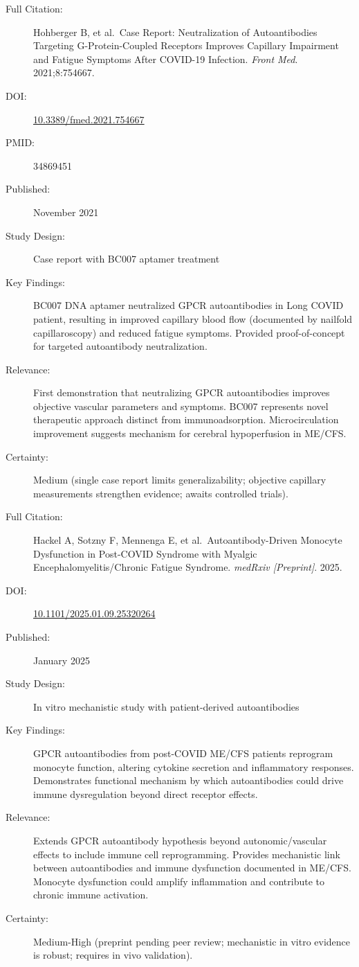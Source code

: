 \begin{description}
    \item[Full Citation:] Hohberger B, et al.\ Case Report: Neutralization of Autoantibodies Targeting G-Protein-Coupled Receptors Improves Capillary Impairment and Fatigue Symptoms After COVID-19 Infection. \textit{Front Med}. 2021;8:754667.
    \item[DOI:] \href{https://doi.org/10.3389/fmed.2021.754667}{10.3389/fmed.2021.754667}
    \item[PMID:] 34869451
    \item[Published:] November 2021
    \item[Study Design:] Case report with BC007 aptamer treatment
    \item[Key Findings:] BC007 DNA aptamer neutralized GPCR autoantibodies in Long COVID patient, resulting in improved capillary blood flow (documented by nailfold capillaroscopy) and reduced fatigue symptoms. Provided proof-of-concept for targeted autoantibody neutralization.
    \item[Relevance:] First demonstration that neutralizing GPCR autoantibodies improves objective vascular parameters and symptoms. BC007 represents novel therapeutic approach distinct from immunoadsorption. Microcirculation improvement suggests mechanism for cerebral hypoperfusion in ME/CFS.
    \item[Certainty:] Medium (single case report limits generalizability; objective capillary measurements strengthen evidence; awaits controlled trials).
\end{description}

\begin{description}
    \item[Full Citation:] Hackel A, Sotzny F, Mennenga E, et al.\ Autoantibody-Driven Monocyte Dysfunction in Post-COVID Syndrome with Myalgic Encephalomyelitis/Chronic Fatigue Syndrome. \textit{medRxiv [Preprint]}. 2025.
    \item[DOI:] \href{https://doi.org/10.1101/2025.01.09.25320264}{10.1101/2025.01.09.25320264}
    \item[Published:] January 2025
    \item[Study Design:] In vitro mechanistic study with patient-derived autoantibodies
    \item[Key Findings:] GPCR autoantibodies from post-COVID ME/CFS patients reprogram monocyte function, altering cytokine secretion and inflammatory responses. Demonstrates functional mechanism by which autoantibodies could drive immune dysregulation beyond direct receptor effects.
    \item[Relevance:] Extends GPCR autoantibody hypothesis beyond autonomic/vascular effects to include immune cell reprogramming. Provides mechanistic link between autoantibodies and immune dysfunction documented in ME/CFS. Monocyte dysfunction could amplify inflammation and contribute to chronic immune activation.
    \item[Certainty:] Medium-High (preprint pending peer review; mechanistic in vitro evidence is robust; requires in vivo validation).
\end{description}

